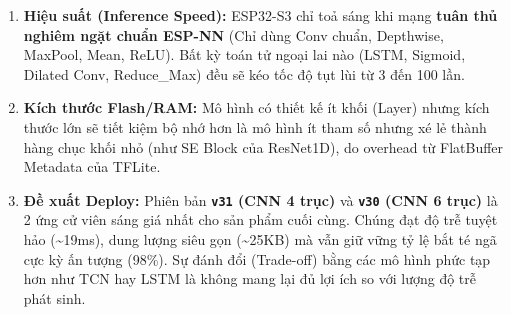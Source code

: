 \documentclass[12pt,a4paper]{article}
\providecommand{\tightlist}{\setlength{\itemsep}{0pt}\setlength{\parskip}{0pt}}
\begin{document}
\begin{enumerate}
\def\labelenumi{\arabic{enumi}.}
\tightlist
\item
  \textbf{Hiệu suất (Inference Speed):} ESP32-S3 chỉ toả sáng khi mạng
  \textbf{tuân thủ nghiêm ngặt chuẩn ESP-NN} (Chỉ dùng Conv chuẩn,
  Depthwise, MaxPool, Mean, ReLU). Bất kỳ toán tử ngoại lai nào (LSTM,
  Sigmoid, Dilated Conv, Reduce\_Max) đều sẽ kéo tốc độ tụt lùi từ 3 đến
  100 lần.
\item
  \textbf{Kích thước Flash/RAM:} Mô hình có thiết kế ít khối (Layer)
  nhưng kích thước lớn sẽ tiết kiệm bộ nhớ hơn là mô hình ít tham số
  nhưng xé lẻ thành hàng chục khối nhỏ (như SE Block của ResNet1D), do
  overhead từ FlatBuffer Metadata của TFLite.
\item
  \textbf{Đề xuất Deploy:} Phiên bản \textbf{\texttt{v31} (CNN 4 trục)}
  và \textbf{\texttt{v30} (CNN 6 trục)} là 2 ứng cử viên sáng giá nhất
  cho sản phẩm cuối cùng. Chúng đạt độ trễ tuyệt hảo
  (\textasciitilde19ms), dung lượng siêu gọn (\textasciitilde25KB) mà
  vẫn giữ vững tỷ lệ bắt té ngã cực kỳ ấn tượng (98\%). Sự đánh đổi
  (Trade-off) bằng các mô hình phức tạp hơn như TCN hay LSTM là không
  mang lại đủ lợi ích so với lượng độ trễ phát sinh.
\end{enumerate}
\end{document}
